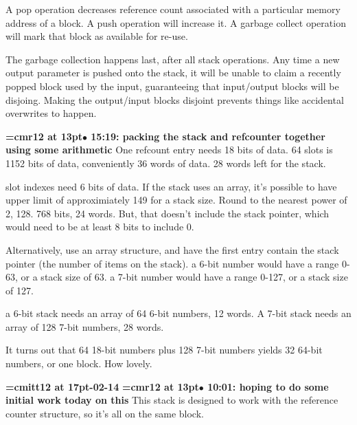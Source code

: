 A pop operation decreases reference count associated with a particular memory address of a block. A push operation will increase it. A garbage collect operation will mark that block as available for re-use.
\par

The garbage collection happens last, after all stack operations. Any time a new output parameter is pushed onto the stack, it will be unable to claim a recently popped block used by the input, guaranteeing that input/output blocks will be disjoing. Making the output/input blocks disjoint prevents things like accidental overwrites to happen.
\par

{\smallskip\noindent\bf\font\titlefont=cmr12 at 13pt\titlefont $\bullet$ 15:19: packing the stack and refcounter together using some arithmetic}\smallskip
One refcount entry needs 18 bits of data. 64 slots is 1152 bits of data, conveniently 36 words of data. 28 words left for the stack.
\par

slot indexes need 6 bits of data. If the stack uses an array, it's possible to have upper limit of approximiately 149 for a stack size. Round to the nearest power of 2, 128. 768 bits, 24 words. But, that doesn't include the stack pointer, which would need to be at least 8 bits to include 0.
\par

Alternatively, use an array structure, and have the first entry contain the stack pointer (the number of items on the stack). a 6-bit number would have a range 0-63, or a stack size of 63. a 7-bit number would have a range 0-127, or a stack size of 127.
\par

a 6-bit stack needs an array of 64 6-bit numbers, 12 words. A 7-bit stack needs an array of 128 7-bit numbers, 28 words.
\par

It turns out that 64 18-bit numbers plus 128 7-bit numbers yields 32 64-bit numbers, or one block. How lovely.
\par

{\medskip\noindent\bf\font\titlefont=cmitt12 at 17pt-02-14}\medskip
{\smallskip\noindent\bf\font\titlefont=cmr12 at 13pt\titlefont $\bullet$ 10:01: hoping to do some initial work today on this}\smallskip
This stack is designed to work with the reference counter structure, so it's all on the same block.
\par

